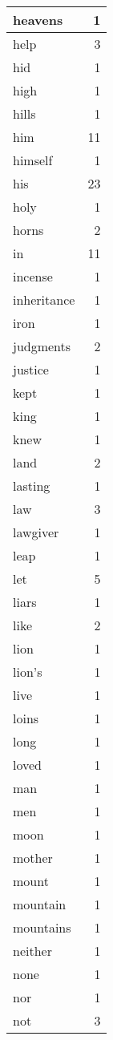 \begin{center}
\begin{longtable}{l|r}
heavens & 1 \\ \hline
help & 3 \\ \hline
hid & 1 \\ \hline
high & 1 \\ \hline
hills & 1 \\ \hline
him & 11 \\ \hline
himself & 1 \\ \hline
his & 23 \\ \hline
holy & 1 \\ \hline
horns & 2 \\ \hline
in & 11 \\ \hline
incense & 1 \\ \hline
inheritance & 1 \\ \hline
iron & 1 \\ \hline
judgments & 2 \\ \hline
justice & 1 \\ \hline
kept & 1 \\ \hline
king & 1 \\ \hline
knew & 1 \\ \hline
land & 2 \\ \hline
lasting & 1 \\ \hline
law & 3 \\ \hline
lawgiver & 1 \\ \hline
leap & 1 \\ \hline
let & 5 \\ \hline
liars & 1 \\ \hline
like & 2 \\ \hline
lion & 1 \\ \hline
lion's & 1 \\ \hline
live & 1 \\ \hline
loins & 1 \\ \hline
long & 1 \\ \hline
loved & 1 \\ \hline
man & 1 \\ \hline
men & 1 \\ \hline
moon & 1 \\ \hline
mother & 1 \\ \hline
mount & 1 \\ \hline
mountain & 1 \\ \hline
mountains & 1 \\ \hline
neither & 1 \\ \hline
none & 1 \\ \hline
nor & 1 \\ \hline
not & 3 \\ \hline

\end{longtable}
\end{center}
